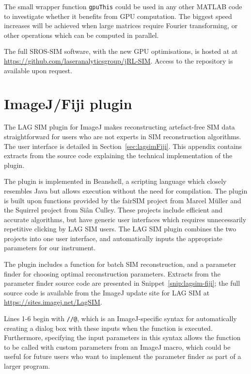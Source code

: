 The small wrapper function \texttt{gpuThis} could be used in any other MATLAB code to investigate whether it benefits from GPU computation. 
The biggest speed increases will be achieved when large matrices require Fourier transforming, or other operations which can be computed in parallel. 

The full SROS-SIM software, with the new GPU optimisations, is hosted at at \url{https://github.com/laseranalyticsgroup/jRL-SIM}. Access to the repository is available upon request. 


\section{ImageJ/Fiji plugin} \label{appx:fiji-lagsim}
The LAG SIM plugin for ImageJ makes reconstructing artefact-free SIM data straightforward for users who are not experts in SIM reconstruction algorithms. 
The user interface is detailed in Section~\ref{sec:lagsimFiji}. 
This appendix contains extracts from the source code explaining the technical implementation of the plugin. 

The plugin is implemented in Beanshell, a scripting language which closely resembles Java but allows execution without the need for compilation. 
The plugin is built upon functions provided by the fairSIM project from Marcel M{\"u}ller and the Squirrel project from Si{\^a}n Culley. 
These projects include efficient and accurate algorithms, but have generic user interfaces which requires unnecessarily repetitive clicking by LAG SIM users. 
The LAG SIM plugin combines the two projects into one user interface, and automatically inputs the appropriate parameters for our instrument. 

The plugin includes a function for batch SIM reconstruction, and a parameter finder for choosing optimal reconstruction parameters. 
Extracts from the parameter finder source code are presented in Snippet~\ref{snip:lagsim-fiji}; the full source code is available from the ImageJ update site for LAG SIM at \url{https://sites.imagej.net/LagSIM}. 

Lines 1-6 begin with \texttt{//@}, which is an ImageJ-specific syntax for automatically creating a dialog box with these inputs when the function is executed. 
Furthermore, specifying the input parameters in this syntax allows the function to be called with custom parameters from an ImageJ macro, which could be useful for future users who want to implement the parameter finder as part of a larger program. 

